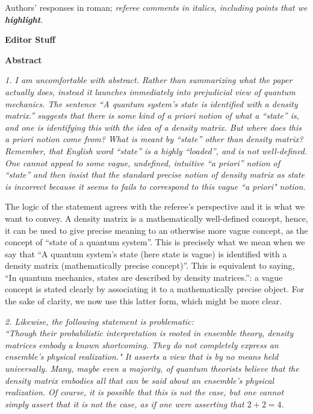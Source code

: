 \documentclass{article}
\newcommand{\REVIEW}[1]{{ \it \textcolor{reviewblack}{#1}}}
\newcommand{\REPLY}[1]{\textcolor{UCDBlue}{#1}}
\newcommand{\HIGHLIGHT}[1]{\textbf{\textcolor{UCDGold}{#1}}}
\begin{document}
\REPLY{Authors' responses in roman;} \REVIEW{referee comments in italics,
including points that we \HIGHLIGHT{highlight}}.

{\bf Editor Stuff}


{\bf Abstract}

\REVIEW{1. I am uncomfortable with abstract. Rather than summarizing what the paper actually does, 
instead it launches immediately into prejudicial view of quantum mechanics. The sentence
``A quantum system’s state is identified with a density matrix.'' suggests that there is some kind 
of a priori notion of what a ``state'' is, and one is identifying this with the idea of a density matrix. 
But where does this a priori notion come from? What is meant by ``state'' other than density matrix?
Remember, that English word ``state'' is a highly ``loaded'', and is not well-defined. One cannot 
appeal to some vague, undefined, intuitive ``a priori'' notion of ``state'' and then insist that the 
standard precise notion of density matrix as state is incorrect because it seems to fails to correspond 
to this vague ``a priori" notion.
}

\REPLY{The logic of the statement agrees with the referee's perspective and it is what we want to convey. 
A density matrix is a mathematically well-defined concept, hence, it can be used to give precise meaning to 
an otherwise more vague concept, as the concept of ``state of a quantum system''. This is precisely 
what we mean when we say that ``A quantum system's state (here state is vague) is identified with 
a density matrix (mathematically precise concept)''. This is equivalent to saying, ``In quantum 
mechanics, states are described by density matrices.'': a vague concept is stated clearly by associating
it to a mathematically precise object. For the sake of clarity, we now use this latter 
form, which might be more clear. }

\REVIEW{2. Likewise, the following statement is problematic:} \\

\REVIEW{``Though their probabilistic interpretation is rooted in ensemble theory, density matrices embody 
a known shortcoming. They do not completely express an ensemble’s physical realization." It asserts a view that 
is by no means held universally. Many, maybe even a majority, of quantum theorists believe that the density 
matrix embodies all that can be said about an ensemble’s physical realization. Of course, it is possible that 
this is not the case, but one cannot simply assert that it is not the case, as if one were asserting that $2 + 2 = 4$.}
\end{document}
